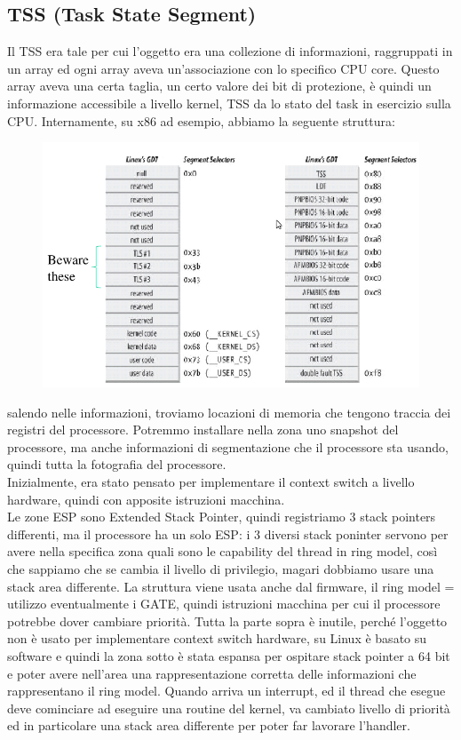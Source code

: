 \documentclass[12pt, oneside]{extbook}
\begin{document}
\subsection{TSS (Task State Segment)}
Il TSS era tale per cui l'oggetto era una collezione di informazioni, raggruppati in un array ed ogni array aveva un'associazione con lo specifico CPU core. Questo array aveva una certa taglia, un certo valore dei bit di protezione, è quindi un informazione accessibile a livello kernel, TSS da lo stato del task in esercizio sulla CPU. Internamente, su x86 ad esempio, abbiamo la seguente struttura:
\begin{figure}[!h]
	\includegraphics[scale=0.3]{immagini/linux_gdt.png}
\end{figure}
salendo nelle informazioni, troviamo locazioni di memoria che tengono traccia dei registri del processore. Potremmo installare nella zona uno snapshot del processore, ma anche informazioni di segmentazione che il processore sta usando, quindi tutta la fotografia del processore.\\ Inizialmente, era stato pensato per implementare il context switch a livello hardware, quindi con apposite istruzioni macchina.\\ Le zone ESP sono Extended Stack Pointer, quindi registriamo 3 stack pointers differenti, ma il processore ha un solo ESP: i 3 diversi stack poninter servono per avere nella specifica zona quali sono le capability del thread in ring model, così che sappiamo che se cambia il livello di privilegio, magari dobbiamo usare una stack area differente. La struttura viene usata anche dal firmware, il ring model = utilizzo eventualmente i GATE, quindi istruzioni macchina per cui il processore potrebbe dover cambiare priorità. Tutta la parte sopra è inutile, perché l'oggetto non è usato per implementare context switch hardware, su Linux è basato su software e quindi la zona sotto è stata espansa per ospitare stack pointer a 64 bit e poter avere nell'area una rappresentazione corretta delle informazioni che rappresentano il ring model. Quando arriva un interrupt, ed il thread che esegue deve cominciare ad eseguire una routine del kernel, va cambiato livello di priorità ed in particolare una stack area differente per poter far lavorare l'handler.
\end{document}
